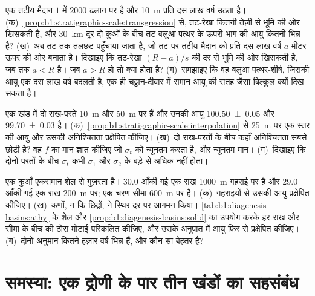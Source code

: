 \begin{exercise}[$\star\star\star$]\label{exo:b1:stratigraphic-scale:10}
एक तटीय मैदान $1$ में $2000$ ढलान पर है और  \qty{10}{m} प्रति दस लाख वर्ष उठता है। (क)~\cref{prop:b1:stratigraphic-scale:transgression} से, तट-रेखा कितनी तेज़ी से भूमि की ओर खिसकती है, और \qty{30}{km} दूर दो कुओं के बीच तट-बलुआ पत्थर के ऊपरी भाग की आयु कितनी भिन्न है? (ख)~अब तट तक तलछट पहुँचाया जाता है, जो तट पर तटीय मैदान को प्रति दस लाख वर्ष $a$ मीटर ऊपर की ओर बनाता है। दिखाइए कि तट-रेखा $(R - a)/s$ की दर से भूमि की ओर खिसकती है, जब तक $a < R$ है। जब $a > R$ हो तो क्या होता है? (ग)~समझाइए कि वह बलुआ पत्थर-शीर्ष, जिसकी आयु एक दस लाख वर्ष बदलती है, एक ही चट्टान-दीवार में समान आयु की सतह जैसा बिल्कुल क्यों दिख सकता है।
\end{exercise}

\begin{exercise}[$\star\star\star$]\label{exo:b1:stratigraphic-scale:11}
एक खंड में दो राख-परतें \qty{10}{m} और \qty{50}{m} पर हैं और उनकी आयु \qty[uncertainty-mode=separate]{100.50(5)}{\Ma} और \qty[uncertainty-mode=separate]{99.70(3)}{\Ma} है। (क)~\cref{prop:b1:stratigraphic-scale:interpolation} से \qty{25}{m} पर एक स्तर की आयु और उसकी अनिश्चितता प्रक्षेपित कीजिए। (ख)~दो राख-परतों के बीच कहाँ अनिश्चितता सबसे छोटी है? वह $f$ का मान ज्ञात कीजिए जो $\sigma_t$ को न्यूनतम करता है, और न्यूनतम मान। (ग)~दिखाइए कि दोनों परतों के बीच $\sigma_t$ कभी $\sigma_1$ और $\sigma_2$ के बड़े से अधिक नहीं होता।
\end{exercise}

\begin{exercise}[$\star\star\star$]\label{exo:b1:stratigraphic-scale:12}
एक कुआँ एकसमान शेल से गुज़रता है। \qty{30.0}{\Ma} आँकी गई एक राख \qty{1000}{m} गहराई पर है और \qty{29.0}{\Ma} आँकी गई एक राख \qty{200}{m} पर; एक चरण-सीमा \qty{600}{m} पर है। (क)~गहराइयों से उसकी आयु प्रक्षेपित कीजिए। (ख)~कणों, न कि छिद्रों, ने स्थिर दर पर आगमन किया। \cref{tab:b1:diagenesis-basins:athy} के शेल और \cref{prop:b1:diagenesis-basins:solid} का उपयोग करके हर राख और सीमा के बीच की ठोस मोटाई परिकलित कीजिए, और उसके अनुपात में आयु फिर से प्रक्षेपित कीजिए। (ग)~दोनों अनुमान कितने हज़ार वर्ष भिन्न हैं, और कौन सा बेहतर है?
\end{exercise}

\section{समस्या: एक द्रोणी के पार तीन खंडों का सहसंबंध}

